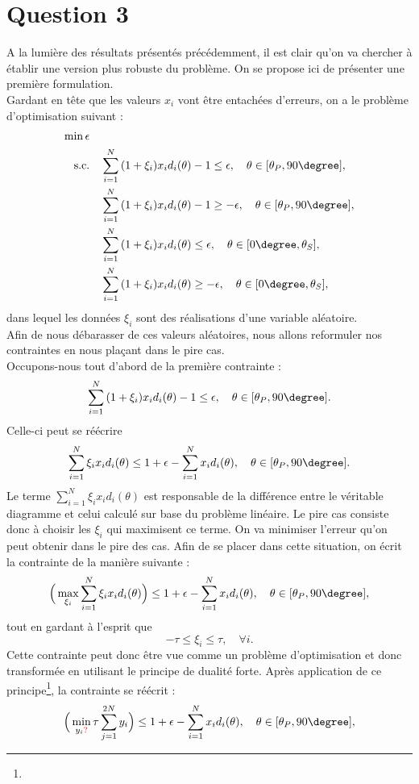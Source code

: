 \section*{Question 3}
A la lumière des résultats présentés précédemment, il est clair qu'on va chercher à établir une version plus robuste du problème. On se propose ici de présenter une première formulation.\\
Gardant en tête que les valeurs $x_i$ vont être entachées d'erreurs, on a le problème d'optimisation suivant :
\begin{align*}
\min \epsilon &\\
\text{s.c.} & \quad \sum_{i=1}^{N}{(1+\xi_i)x_i d_i(\theta)}-1 \leq \epsilon, \quad \theta \in [\theta_P,90\degree],\\
 & \quad \sum_{i=1}^{N}{(1+\xi_i)x_i d_i(\theta)}-1 \geq -\epsilon, \quad \theta \in [\theta_P,90\degree],\\
 & \quad \sum_{i=1}^{N}{(1+\xi_i)x_i d_i(\theta)} \leq \epsilon, \quad \theta \in [0\degree,\theta_S],\\
 & \quad \sum_{i=1}^{N}{(1+\xi_i)x_i d_i(\theta)} \geq -\epsilon, \quad \theta \in [0\degree,\theta_S],
\end{align*}
dans lequel les données $\xi_i$ sont des réalisations d'une variable aléatoire.\\
Afin de nous débarasser de ces valeurs aléatoires, nous allons reformuler nos contraintes en nous plaçant dans le pire cas.\\
Occupons-nous tout d'abord de la première contrainte : $$\sum_{i=1}^{N}{(1+\xi_i)x_i d_i(\theta)}-1 \leq \epsilon, \quad \theta \in [\theta_P,90\degree].$$
Celle-ci peut se réécrire $$\sum_{i=1}^{N}{\xi_i x_i d_i(\theta)} \leq 1+\epsilon-\sum_{i=1}^{N}{x_i d_i(\theta)}, \quad \theta \in [\theta_P,90\degree].$$
Le terme $\sum_{i=1}^{N}{\xi_i x_i d_i(\theta)}$ est responsable de la différence entre le véritable diagramme et celui calculé sur base du problème linéaire. Le pire cas consiste donc à choisir les $\xi_i$ qui maximisent ce terme. On va minimiser l'erreur qu'on peut obtenir dans le pire des cas. Afin de se placer dans cette situation, on écrit la contrainte de la manière suivante : $$\Big(\max_{\xi_i} \sum_{i=1}^{N}{\xi_i x_i d_i(\theta)}\Big) \leq 1+\epsilon-\sum_{i=1}^{N}{x_i d_i(\theta)}, \quad \theta \in [\theta_P,90\degree],$$ tout en gardant à l'esprit que $$-\tau \leq \xi_i \leq \tau, \quad \forall i.$$
Cette contrainte peut donc être vue comme un problème d'optimisation et donc transformée en utilisant le principe de dualité forte. Après application de ce principe\footnote{}, la contrainte se réécrit : $$\Big(\min_{y_i\red{?}} \tau \sum_{j=1}^{2N}{y_i}\Big) \leq 1+\epsilon-\sum_{i=1}^{N}{x_i d_i(\theta)}, \quad \theta \in [\theta_P,90\degree],$$ 
